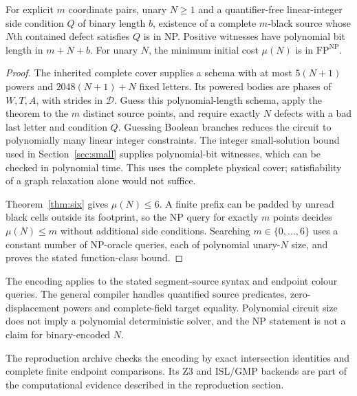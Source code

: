 \begin{corollary}
For explicit $m$ coordinate pairs, unary $N\ge1$ and a quantifier-free
linear-integer side condition $Q$ of binary length $b$, existence of a
complete $m$-black source whose $N$th contained defect satisfies $Q$ is
in NP. Positive witnesses have polynomial bit length in $m+N+b$.
For unary $N$, the minimum initial cost $\mu(N)$ is in $\mathrm{FP}^{\mathrm{NP}}$.
\end{corollary}
\begin{proof}
The inherited complete cover supplies a schema with at most $5(N+1)$
powers and $2048(N+1)+N$ fixed letters. Its powered bodies are phases of
$W,T,A$, with strides in $\mathcal D$. Guess this polynomial-length
schema, apply the theorem to the $m$ distinct source points, and require
exactly $N$ defects with a bad last letter and condition $Q$.
Guessing Boolean branches reduces the circuit to polynomially many linear
integer constraints. The integer small-solution bound used in
Section~\ref{sec:small} supplies polynomial-bit witnesses, which can be
checked in polynomial time. This uses the complete physical cover;
satisfiability of a graph relaxation alone would not suffice.

Theorem~\ref{thm:six} gives $\mu(N)\le6$. A finite prefix can be padded
by unread black cells outside its footprint, so the NP query for exactly $m$
points decides $\mu(N)\le m$ without additional side conditions. Searching
$m\in\{0,\ldots,6\}$ uses a constant number of NP-oracle queries, each of
polynomial unary-$N$ size, and proves the stated function-class bound.
\end{proof}

The encoding applies to the stated segment-source syntax and endpoint
colour queries. The general compiler handles quantified source predicates,
zero-displacement powers and complete-field target equality. Polynomial circuit size does not
imply a polynomial deterministic solver, and the NP statement is not a
claim for binary-encoded $N$.

The reproduction archive checks the encoding by exact intersection
identities and complete finite endpoint comparisons. Its Z3 and ISL/GMP
backends are part of the computational evidence described in the
reproduction section.
